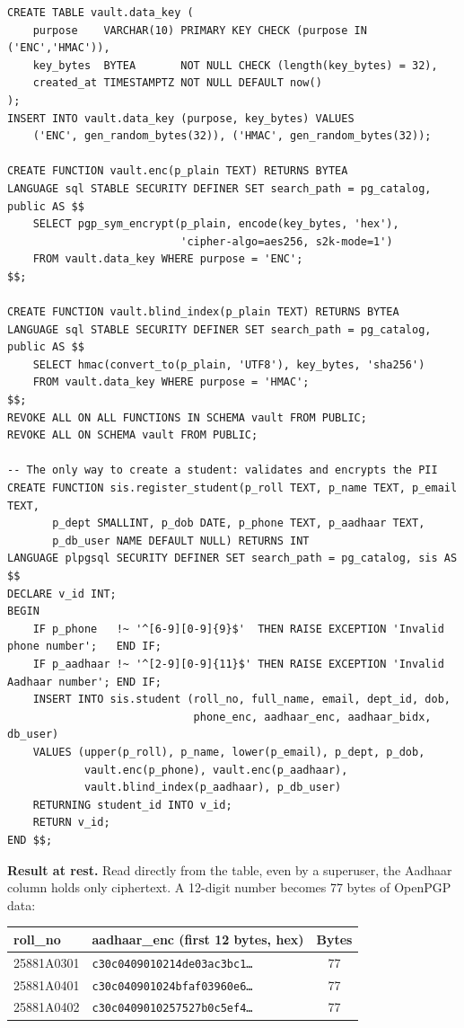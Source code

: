 \documentclass[11pt,a4paper]{report}
\begin{document}
\begin{lstlisting}[caption={Key vault and encryption functions (from \texttt{02\_schema.sql})}]
CREATE TABLE vault.data_key (
    purpose    VARCHAR(10) PRIMARY KEY CHECK (purpose IN ('ENC','HMAC')),
    key_bytes  BYTEA       NOT NULL CHECK (length(key_bytes) = 32),
    created_at TIMESTAMPTZ NOT NULL DEFAULT now()
);
INSERT INTO vault.data_key (purpose, key_bytes) VALUES
    ('ENC', gen_random_bytes(32)), ('HMAC', gen_random_bytes(32));

CREATE FUNCTION vault.enc(p_plain TEXT) RETURNS BYTEA
LANGUAGE sql STABLE SECURITY DEFINER SET search_path = pg_catalog, public AS $$
    SELECT pgp_sym_encrypt(p_plain, encode(key_bytes, 'hex'),
                           'cipher-algo=aes256, s2k-mode=1')
    FROM vault.data_key WHERE purpose = 'ENC';
$$;

CREATE FUNCTION vault.blind_index(p_plain TEXT) RETURNS BYTEA
LANGUAGE sql STABLE SECURITY DEFINER SET search_path = pg_catalog, public AS $$
    SELECT hmac(convert_to(p_plain, 'UTF8'), key_bytes, 'sha256')
    FROM vault.data_key WHERE purpose = 'HMAC';
$$;
REVOKE ALL ON ALL FUNCTIONS IN SCHEMA vault FROM PUBLIC;
REVOKE ALL ON SCHEMA vault FROM PUBLIC;

-- The only way to create a student: validates and encrypts the PII
CREATE FUNCTION sis.register_student(p_roll TEXT, p_name TEXT, p_email TEXT,
       p_dept SMALLINT, p_dob DATE, p_phone TEXT, p_aadhaar TEXT,
       p_db_user NAME DEFAULT NULL) RETURNS INT
LANGUAGE plpgsql SECURITY DEFINER SET search_path = pg_catalog, sis AS $$
DECLARE v_id INT;
BEGIN
    IF p_phone   !~ '^[6-9][0-9]{9}$'  THEN RAISE EXCEPTION 'Invalid phone number';   END IF;
    IF p_aadhaar !~ '^[2-9][0-9]{11}$' THEN RAISE EXCEPTION 'Invalid Aadhaar number'; END IF;
    INSERT INTO sis.student (roll_no, full_name, email, dept_id, dob,
                             phone_enc, aadhaar_enc, aadhaar_bidx, db_user)
    VALUES (upper(p_roll), p_name, lower(p_email), p_dept, p_dob,
            vault.enc(p_phone), vault.enc(p_aadhaar),
            vault.blind_index(p_aadhaar), p_db_user)
    RETURNING student_id INTO v_id;
    RETURN v_id;
END $$;
\end{lstlisting}

\textbf{Result at rest.} Read directly from the table, even by a superuser, the Aadhaar column holds only ciphertext. A 12-digit number becomes 77 bytes of OpenPGP data:
\begin{center}
\footnotesize
\begin{tabular}{|l|l|c|}
    \hline
    \textbf{roll\_no} & \textbf{aadhaar\_enc (first 12 bytes, hex)} & \textbf{Bytes} \\ \hline
    25881A0301 & \texttt{c30c0409010214de03ac3bc1\dots} & 77 \\ \hline
    25881A0401 & \texttt{c30c040901024bfaf03960e6\dots} & 77 \\ \hline
    25881A0402 & \texttt{c30c0409010257527b0c5ef4\dots} & 77 \\ \hline
\end{tabular}
\end{center}
\end{document}
